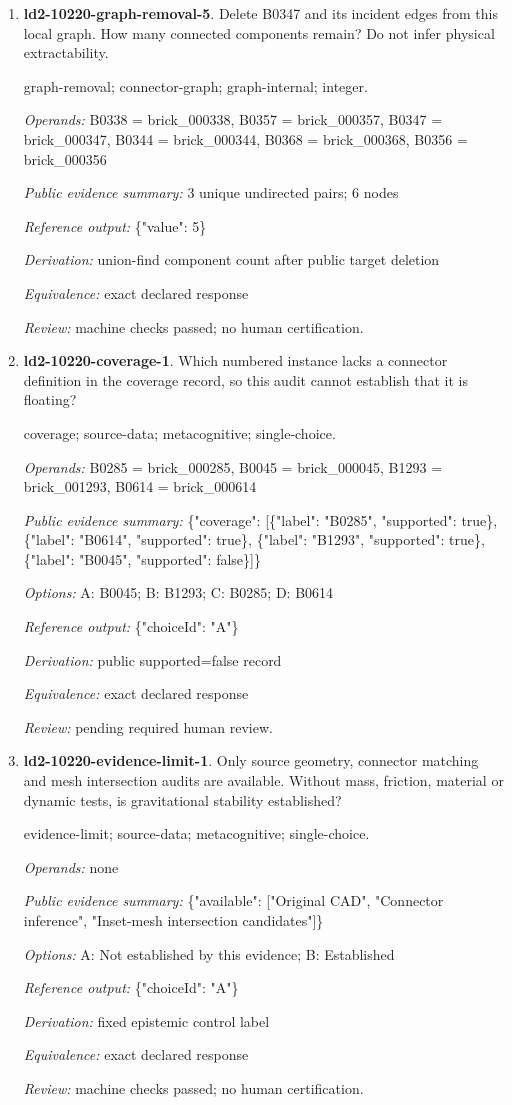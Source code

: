 \begin{enumerate}
\item \textbf{ld2-10220-graph-removal-5}. Delete B0347 and its incident edges from this local graph. How many connected components remain? Do not infer physical extractability.
\par{\small graph-removal; connector-graph; graph-internal; integer.\par\textit{Operands:} B0338 = brick\_000338, B0357 = brick\_000357, B0347 = brick\_000347, B0344 = brick\_000344, B0368 = brick\_000368, B0356 = brick\_000356\par\textit{Public evidence summary:} 3 unique undirected pairs; 6 nodes\par\textit{Reference output:} \{"value": 5\}\par\textit{Derivation:} union-find component count after public target deletion\par\textit{Equivalence:} exact declared response\par\textit{Review:} machine checks passed; no human certification.}
\item \textbf{ld2-10220-coverage-1}. Which numbered instance lacks a connector definition in the coverage record, so this audit cannot establish that it is floating?
\par{\small coverage; source-data; metacognitive; single-choice.\par\textit{Operands:} B0285 = brick\_000285, B0045 = brick\_000045, B1293 = brick\_001293, B0614 = brick\_000614\par\textit{Public evidence summary:} \{"coverage": [\{"label": "B0285", "supported": true\}, \{"label": "B0614", "supported": true\}, \{"label": "B1293", "supported": true\}, \{"label": "B0045", "supported": false\}]\}\par\textit{Options:} A: B0045; B: B1293; C: B0285; D: B0614\par\textit{Reference output:} \{"choiceId": "A"\}\par\textit{Derivation:} public supported=false record\par\textit{Equivalence:} exact declared response\par\textit{Review:} pending required human review.}
\item \textbf{ld2-10220-evidence-limit-1}. Only source geometry, connector matching and mesh intersection audits are available. Without mass, friction, material or dynamic tests, is gravitational stability established?
\par{\small evidence-limit; source-data; metacognitive; single-choice.\par\textit{Operands:} none\par\textit{Public evidence summary:} \{"available": ["Original CAD", "Connector inference", "Inset-mesh intersection candidates"]\}\par\textit{Options:} A: Not established by this evidence; B: Established\par\textit{Reference output:} \{"choiceId": "A"\}\par\textit{Derivation:} fixed epistemic control label\par\textit{Equivalence:} exact declared response\par\textit{Review:} machine checks passed; no human certification.}

\end{enumerate}
